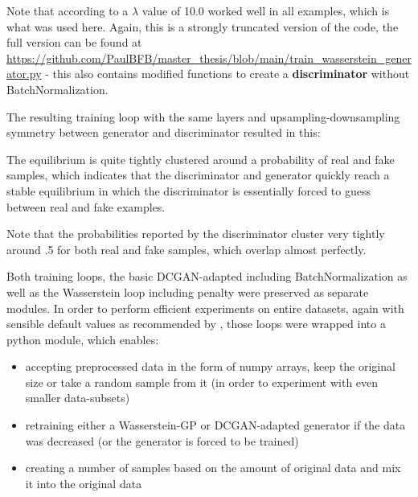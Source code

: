 

Note that according to \cite{gulrajani2017improved} a $\lambda$ value of 10.0 worked well in all examples, which is what was used here. Again, this is a strongly truncated version of the code, the full version can be found at \url{https://github.com/PaulBFB/master_thesis/blob/main/train_wasserstein_generator.py} - this also contains modified functions to create a \textbf{discriminator} without BatchNormalization.

The resulting training loop with the same layers and upsampling-downsampling symmetry between generator and discriminator resulted in this:


The equilibrium is quite tightly clustered around a probability of real and fake samples, which indicates that the discriminator and generator quickly reach a stable equilibrium 
in which the discriminator is essentially forced to guess between real and fake examples. 

Note that the probabilities reported by the discriminator cluster very tightly around .5 for both real and fake samples, which overlap almost perfectly.

\pagebreak

Both training loops, the basic DCGAN-adapted including BatchNormalization as well as the Wasserstein loop including penalty were preserved as separate modules. 
In order to perform efficient experiments on entire datasets, again with sensible default values as recommended by \cite{buitinck2013api}, those loops were wrapped into a python module, which enables:

\begin{itemize}
	\item accepting preprocessed data in the form of numpy arrays, keep the original size or take a random sample from it (in order to experiment with even smaller data-subsets)
	\item retraining either a Wasserstein-GP or DCGAN-adapted generator if the data was decreased (or the generator is forced to be trained)
	\item creating a number of samples based on the amount of original data and mix it into the original data
\end{itemize}

